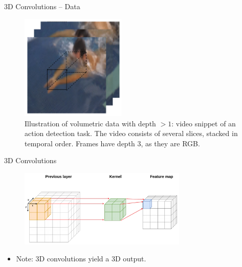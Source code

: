 \begin{vbframe}{3D Convolutions -- Data}
    \begin{figure}
        \centering
        \includegraphics[width=5cm]{plots/05_conv_variations/3d/swim.png}
        \caption{Illustration of volumetric data with depth $> 1$: video snippet of an action detection task. The video consists of several slices, stacked in temporal order. Frames have depth $3$, as they are RGB.}
    \end{figure}
\end{vbframe}

\begin{vbframe}{3D Convolutions}
    \begin{figure}
        \centering
        \includegraphics[width=8cm]{plots/05_conv_variations/3d/3dconv.png}
    \end{figure}
    \begin{itemize}
        \item Note: 3D convolutions yield a 3D output.
    \end{itemize}
\end{vbframe}

